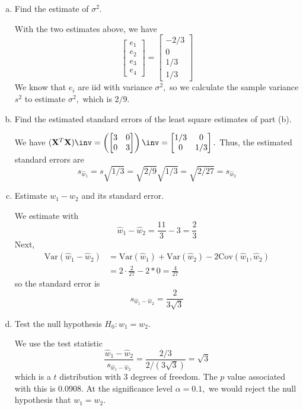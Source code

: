 \documentclass{article}
\newcommand{\var}{\mathrm{Var}}
\newcommand{\cov}{\mathrm{Cov}}
\begin{document}
\begin{itemize}
\begin{enumerate}[a.]
			\item Find the estimate of $\sigma^2.$
				\begin{soln}
					With the two estimates above, we have
					\[\begin{bmatrix}
							e_1 \\ e_2 \\ e_3 \\ e_4
						\end{bmatrix} = \begin{bmatrix}
							-2/3 \\ 0 \\ 1/3 \\ 1/3
					\end{bmatrix}\]
					We know that $e_i$ are iid with variance $\sigma^2,$ so we calculate the sample variance $s^2$ to estimate $\sigma^2,$ which is $2/9.$
				\end{soln}

			\item Find the estimated standard errors of the least square estimates of part (b).
				\begin{soln}
					We have $(\mathbf{X}^T \mathbf{X})\inv=\left( \begin{bmatrix}
						3 & 0 \\ 0 & 3
					\end{bmatrix}\right)\inv = \begin{bmatrix}
						1/3 & 0 \\ 0 & 1/3
					\end{bmatrix}.$ Thus, the estimated standard errors are 
					\[s_{\hat w_1} = s\sqrt{1/3} = \sqrt{2/9}\sqrt{1/3} = \sqrt{2/27} = s_{\hat w_2}\]
				\end{soln}

			\item Estimate $w_1-w_2$ and its standard error.
				\begin{soln}
					We estimate with 
					\[\hat w_1-\hat w_2 = \frac{11}{3} - 3 = \frac{2}{3}\]
					Next,
					\begin{align*}
						\var(\hat w_1-\hat w_2) &= \var(\hat w_1)+\var(\hat w_2) - 2\cov(\hat w_1, \hat w_2) \\
						&= 2\cdot\frac{2}{27} - 2*0 = \frac{4}{27}
					\end{align*}
					so the standard error is
					\[s_{\hat w_1-\hat w_2} = \frac{2}{3\sqrt{3}}\]
				\end{soln}

			\item Test the null hypothesis $H_0: w_1=w_2.$
				\begin{soln}
					We use the test statistic
					\[\frac{\hat w_1-\hat w_2}{s_{\hat w_1-\hat w_2}} = \frac{2/3}{2/(3\sqrt{3})} = \sqrt{3}\]
					which is a $t$ distribution with 3 degrees of freedom. The $p$ value associated with this is 0.0908. At the significance level $\alpha=0.1,$ we would reject the null hypothesis that $w_1=w_2.$
				\end{soln}
				

\end{enumerate}
\end{itemize}
\end{document}
